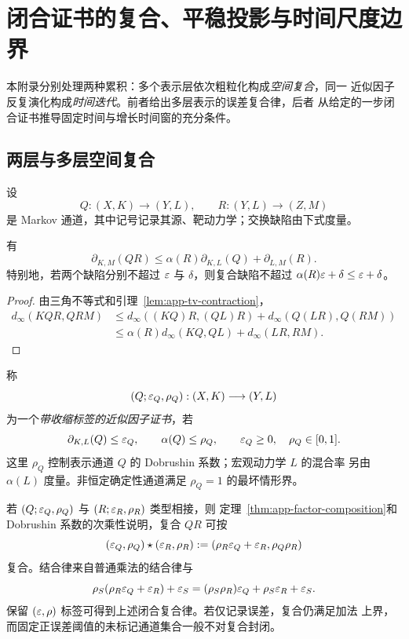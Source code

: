 \section{闭合证书的复合、平稳投影与时间尺度边界}
\label{app:composition-time}

本附录分别处理两种累积：多个表示层依次粗粒化构成\emph{空间复合}，同一
近似因子反复演化构成\emph{时间迭代}。前者给出多层表示的误差复合律，后者
从给定的一步闭合证书推导固定时间与增长时间窗的充分条件。

\subsection{两层与多层空间复合}

设
\[
 Q:(X,K)\longrightarrow(Y,L),
 \qquad
 R:(Y,L)\longrightarrow(Z,M)
\]
是 Markov 通道，其中记号记录其源、靶动力学；交换缺陷由下式度量。

\begin{theorem}[近似动力学因子的复合]
\label{thm:app-factor-composition}
有
\begin{equation}
 \partial_{K,M}(QR)
 \le
 \alpha(R)\partial_{K,L}(Q)+\partial_{L,M}(R).
 \label{eq:app-two-layer-composition}
\end{equation}
特别地，若两个缺陷分别不超过 $\varepsilon$ 与 $\delta$，则复合缺陷不超过
$\alpha(R)\varepsilon+\delta\le\varepsilon+\delta$。
\end{theorem}

\begin{proof}
由三角不等式和引理~\ref{lem:app-tv-contraction}，
\begin{align*}
 d_\infty(KQR,QRM)
 &\le d_\infty((KQ)R,(QL)R)
      +d_\infty(Q(LR),Q(RM))\\
 &\le \alpha(R)d_\infty(KQ,QL)+d_\infty(LR,RM).
\end{align*}
\end{proof}

称
\[
 (Q;\varepsilon_Q,\rho_Q):(X,K)\longrightarrow(Y,L)
\]
为一个\emph{带收缩标签的近似因子证书}，若
\begin{equation}
 \partial_{K,L}(Q)\le\varepsilon_Q,
 \qquad
 \alpha(Q)\le\rho_Q,
 \qquad
 \varepsilon_Q\ge0,
 \quad \rho_Q\in[0,1].
 \label{eq:app-contraction-labelled-certificate}
\end{equation}
这里 $\rho_Q$ 控制表示通道 $Q$ 的 Dobrushin 系数；宏观动力学 $L$ 的混合率
另由 $\alpha(L)$ 度量。非恒定确定性通道满足 $\rho_Q=1$ 的最坏情形界。

若 $(Q;\varepsilon_Q,\rho_Q)$ 与 $(R;\varepsilon_R,\rho_R)$ 类型相接，则
定理~\ref{thm:app-factor-composition}和 Dobrushin 系数的次乘性说明，复合
$QR$ 可按
\begin{equation}
 (\varepsilon_Q,\rho_Q)\star(\varepsilon_R,\rho_R)
 :=(\rho_R\varepsilon_Q+\varepsilon_R,\rho_Q\rho_R)
 \label{eq:app-certificate-composition}
\end{equation}
复合。结合律来自普通乘法的结合律与
\[
 \rho_S(\rho_R\varepsilon_Q+\varepsilon_R)+\varepsilon_S
 =(\rho_S\rho_R)\varepsilon_Q+\rho_S\varepsilon_R+\varepsilon_S.
\]
保留 $(\varepsilon,\rho)$ 标签可得到上述闭合复合律。若仅记录误差，复合仍满足加法
上界，而固定正误差阈值的未标记通道集合一般不对复合封闭。

